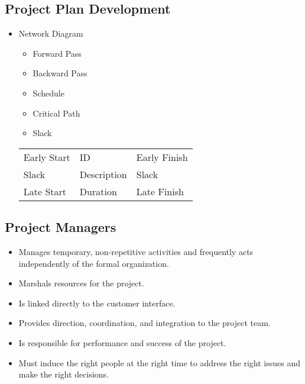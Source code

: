 \documentclass[8pt, letter]{extarticle}
\begin{document}
\begin{multicols}{2}
    \subsection{Project Plan Development}
    \begin{itemize}
        \item Network Diagram
            \begin{itemize}
                \item Forward Pass
                \item Backward Pass
                \item Schedule
                \item Critical Path
                \item Slack
            \end{itemize}
            \begin{tabular}{ l l l }
                Early Start & ID            & Early Finish  \\
                Slack       & Description   & Slack         \\
                Late Start  & Duration      & Late Finish   \\
            \end{tabular}
    \end{itemize}

    \subsection{Project Managers}
    \begin{itemize}
        \item Manages temporary, non-repetitive activities and frequently acts independently of the formal organization.
        \item Marshals resources for the project.
        \item Is linked directly to the customer interface.
        \item Provides direction, coordination, and integration to the project team.
        \item Is responsible for performance and success of the project.
        \item Must induce the right people at the right time to address the right issues and make the right decisions.
    \end{itemize}


\end{multicols}
\end{document}
